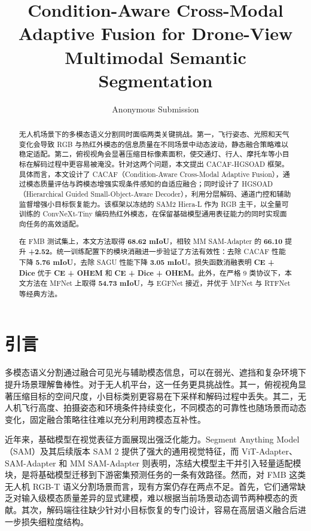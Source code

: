 \documentclass[UTF8,10pt,twocolumn]{ctexart}
\title{\bfseries Condition-Aware Cross-Modal Adaptive Fusion for Drone-View Multimodal Semantic Segmentation}
\author{Anonymous Submission}
\date{}
\newcommand{\method}{CACAF-HGSOAD}
\begin{document}
\maketitle

\begin{abstract}
无人机场景下的多模态语义分割同时面临两类关键挑战。第一，飞行姿态、光照和天气变化会导致 RGB 与热红外模态的信息质量在不同场景中动态波动，静态融合策略难以稳定适配。第二，俯视视角会显著压缩目标像素面积，使交通灯、行人、摩托车等小目标在解码过程中更容易被淹没。针对这两个问题，本文提出 \method{} 框架。具体而言，本文设计了 CACAF（Condition-Aware Cross-Modal Adaptive Fusion），通过模态质量评估与跨模态增强实现条件感知的自适应融合；同时设计了 HGSOAD（Hierarchical Guided Small-Object-Aware Decoder），利用分层解码、通道门控和辅助监督增强小目标恢复能力。该框架以冻结的 SAM2 Hiera-L 作为 RGB 主干，以全量可训练的 ConvNeXt-Tiny 编码热红外模态，在保留基础模型通用表征能力的同时实现面向任务的高效适配。

在 FMB 测试集上，本文方法取得 \textbf{68.62 mIoU}，相较 MM SAM-Adapter 的 \textbf{66.10} 提升 \textbf{+2.52}。统一训练配置下的模块消融进一步验证了方法有效性：去除 CACAF 性能下降 \textbf{5.76 mIoU}，去除 SAGU 性能下降 \textbf{3.05 mIoU}。损失函数消融表明 \textbf{CE + Dice} 优于 \textbf{CE + OHEM} 和 \textbf{CE + Dice + OHEM}。此外，在严格 9 类协议下，本文方法在 MFNet 上取得 \textbf{54.73 mIoU}，与 EGFNet 接近，并优于 MFNet 与 RTFNet 等经典方法。
\end{abstract}

\section{引言}

多模态语义分割通过融合可见光与辅助模态信息，可以在弱光、遮挡和复杂环境下提升场景理解鲁棒性。对于无人机平台，这一任务更具挑战性。其一，俯视视角显著压缩目标的空间尺度，小目标类别更容易在下采样和解码过程中丢失。其二，无人机飞行高度、拍摄姿态和环境条件持续变化，不同模态的可靠性也随场景而动态变化，固定融合策略往往难以充分利用跨模态互补性。

近年来，基础模型在视觉表征方面展现出强泛化能力。Segment Anything Model（SAM）及其后续版本 SAM 2 提供了强大的通用视觉特征，而 ViT-Adapter、SAM-Adapter 和 MM SAM-Adapter 则表明，冻结大模型主干并引入轻量适配模块，是将基础模型迁移到下游密集预测任务的一条有效路径。然而，对 FMB 这类无人机 RGB-T 语义分割场景而言，现有方案仍存在两点不足。首先，它们通常缺乏对输入级模态质量差异的显式建模，难以根据当前场景动态调节两种模态的贡献。其次，解码端往往缺少针对小目标恢复的专门设计，容易在高层语义融合后进一步损失细粒度结构。
\end{document}
